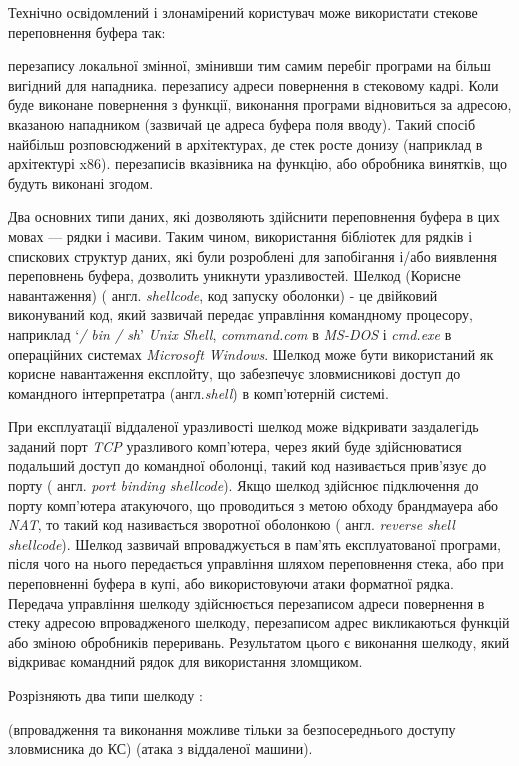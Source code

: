 Технічно освідомлений і злонамірений користувач може використати стекове переповнення буфера так:
\begin{enumerate}
 перезапису локальної змінної, змінивши тим самим перебіг програми на більш вигідний для нападника.
 перезапису адреси повернення в стековому кадрі. Коли буде виконане повернення з функції, виконання програми відновиться за адресою, вказаною нападником (зазвичай це адреса буфера поля вводу). Такий спосіб найбільш розповсюджений в архітектурах, де стек росте донизу (наприклад в архітектурі x86).
 перезаписів вказівника на функцію, або обробника винятків, що будуть виконані згодом. 
\end{enumerate}

Два основних типи даних, які дозволяють здійснити переповнення буфера в цих мовах — рядки і масиви. Таким чином, використання бібліотек для рядків і спискових структур даних, які були розроблені для запобігання і/або виявлення переповнень буфера, дозволить уникнути уразливостей.
Шелкод (Корисне навантаження) ( англ. {\it shellcode}, код запуску оболонки) - це двійковий виконуваний код, який зазвичай передає управління командному процесору,  наприклад `{\it / bin / sh}'  {\it Unix Shell}, {\it command.com} в {\it MS-DOS} і {\it cmd.exe} в операційних системах {\it Microsoft Windows}.  Шелкод може бути використаний як корисне навантаження експлойту, що забезпечує зловмисникові доступ до командного інтерпретатра (англ.{\it shell}) в комп'ютерній системі.

При експлуатації віддаленої уразливості шелкод може відкривати заздалегідь заданий порт {\it TCP} уразливого комп'ютера, через який буде здійснюватися подальший доступ до командної оболонці, такий код називається прив'язує до порту ( англ. {\it port binding shellcode}).  Якщо шелкод здійснює підключення до порту комп'ютера атакуючого, що проводиться з метою обходу брандмауера або {\it NAT}, то такий код називається зворотної оболонкою ( англ. {\it reverse shell shellcode}).
Шелкод зазвичай впроваджується в пам'ять експлуатованої програми, після чого на нього передається управління шляхом переповнення стека, або при переповненні буфера в купі, або використовуючи атаки форматної рядка.  Передача управління шелкоду здійснюється перезаписом адреси повернення в стеку адресою впровадженого шелкоду, перезаписом адрес викликаються функцій або зміною обробників переривань.  Результатом цього є виконання шелкоду, який відкриває командний рядок для використання зломщиком.

Розрізняють два типи шелкоду :
\begin{itemize}
 (впровадження та виконання можливе тільки за безпосереднього доступу зловмисника до КС)
 (атака з віддаленої машини). 
\end{itemize}

